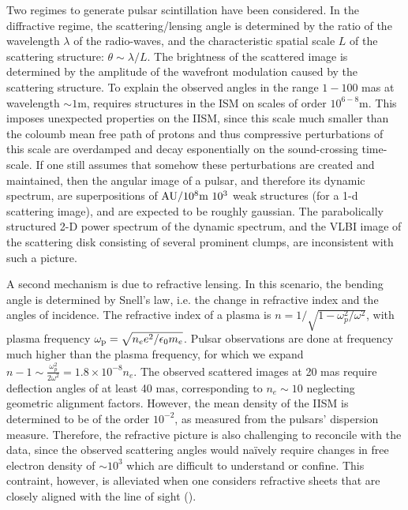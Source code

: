 \documentclass[useAMS,usenatbib]{mn2e}
\begin{document}
Two regimes to generate pulsar scintillation have been considered. In
the diffractive regime, the scattering/lensing angle is determined by
the ratio of the wavelength
$\lambda$ of the radio-waves, and the characteristic spatial scale $L$ of the scattering structure: $\theta\sim\lambda/L$.   The brightness of the scattered
image  is determined by the amplitude of the wavefront modulation caused by the scattering structure.  To explain
the observed angles in the range $1-100$ mas at wavelength $\sim 1$m,
requires structures in the ISM on scales of order $10^{6-8}$m. This
imposes unexpected properties on the IISM, since this scale
much smaller than the coloumb mean free path of protons and thus compressive perturbations of
this scale are overdamped and decay esponentially on the sound-crossing time-scale.  If one still assumes that somehow these perturbations are created and maintained,
then the angular image of a
pulsar, and therefore its dynamic spectrum, are superpositions of $\hbox{AU}/10^8\hbox{m}~10^3$ weak structures (for a 1-d scattering image), and are expected to be roughly gaussian.  The
parabolically structured 2-D power spectrum of the dynamic spectrum,
and the VLBI image of the scattering disk consisting of several prominent clumps, are inconsistent with such
a picture.

A second mechanism is due to refractive lensing.  In this scenario,
the bending angle is determined by Snell's law, i.e. the change in
refractive index and the angles of incidence.  The refractive index of
a plasma is $n=1/\sqrt{1-\omega_p^2/\omega^2}$, with plasma frequency
$\omega_{\rm p}=\sqrt{n_e e^2/\epsilon_{0}m_e}$.  Pulsar observations
are done at frequency much higher than the plasma frequency, for which
we expand $n-1 \sim \frac{\omega_p^2}{2 \omega^2} = 1.8\times 10^{-8}
n_e$.  The observed scattered images at 20 mas require deflection
angles of at least 40 mas, corresponding to $n_e \sim 10$ neglecting
geometric alignment factors.  However, the mean density of the IISM is determined to
be
of the order $10^{-2}$, as measured  from the pulsars' dispersion measure.
Therefore, the refractive picture is  also challenging to reconcile with the data, since the observed
scattering angles would na\"ively require changes in free electron
density of $\sim 10^3$ 
which are difficult to understand or confine. This contraint, however, is alleviated
when one considers refractive sheets that are closely aligned with the line of sight
(\cite{2006ApJ...640L.159G}).
\end{document}
